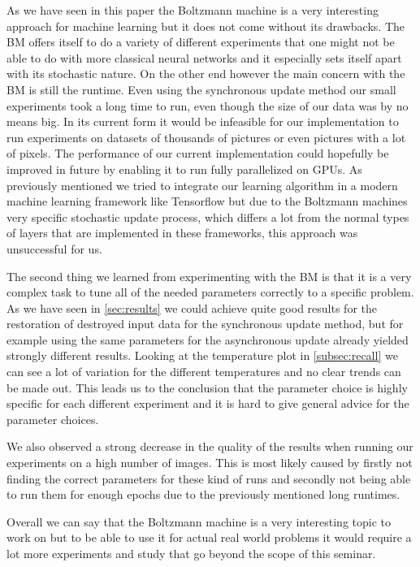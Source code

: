\documentclass[12pt,twoside]{article}
\theoremstyle{plain}
\theoremstyle{definition}
\theoremstyle{remark}
\begin{document}
As we have seen in this paper the Boltzmann machine is a very interesting approach for machine learning but it does not come without its drawbacks.
The BM offers itself to do a variety of different experiments that one might not be able to do with more classical neural networks and it especially
sets itself apart with its stochastic nature. On the other end however the main concern with the BM is still the runtime.
Even using the synchronous update method our small experiments took a long time to run, even though the size of our data was by no means big.
In its current form it would be infeasible for our implementation to run experiments on datasets of thousands of pictures or even pictures with
a lot of pixels. The performance of our current implementation could hopefully be improved in future by enabling it to run fully
parallelized on GPUs. As previously mentioned we tried to integrate our learning algorithm in a modern machine learning framework 
like Tensorflow but due to the Boltzmann machines very specific stochastic update process, which differs a lot from 
the normal types of layers that are implemented in these frameworks, this approach was unsuccessful for us.

The second thing we learned from experimenting with the BM is that it is a very complex task to tune all of the needed parameters correctly to a
specific problem. As we have seen in \cref{sec:results} we could achieve quite good results for the restoration of destroyed
input data for the synchronous update method, but for example using the same parameters for the asynchronous update already yielded
strongly different results. Looking at the temperature plot in \cref{subsec:recall} we can see a lot of variation for the different temperatures
and no clear trends can be made out. This leads us to the conclusion that the parameter choice is highly specific for each different
experiment and it is hard to give general advice for the parameter choices.

We also observed a strong decrease in the quality of the results when running our experiments on a high number of images.
This is most likely caused by firstly not finding the correct parameters for these kind of runs and secondly 
not being able to run them for enough epochs due to the previously mentioned long runtimes.

Overall we can say that the Boltzmann machine is a very interesting topic to work on but to be able to use
it for actual real world problems it would require a lot more experiments and study that go beyond the scope of this seminar.
\end{document}
